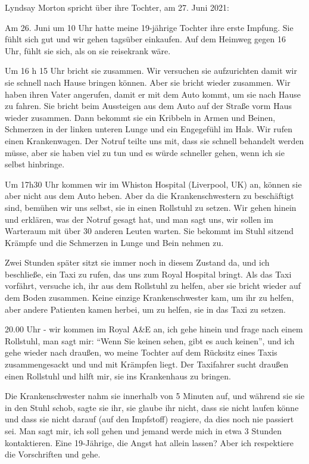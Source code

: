 Lyndsay Morton spricht über ihre Tochter, am 27. Juni 2021:

Am 26. Juni um 10 Uhr hatte meine 19-jährige Tochter ihre erste Impfung. Sie
fühlt sich gut und wir gehen tagsüber einkaufen. Auf dem Heimweg gegen 16 Uhr,
fühlt sie sich, als on sie reisekrank wäre.

Um 16 h 15 Uhr bricht sie zusammen. Wir versuchen sie aufzurichten damit wir sie
schnell nach Hause bringen können. Aber sie bricht wieder zusammen. Wir haben
ihren Vater angerufen, damit er mit dem Auto kommt, um sie nach Hause zu
fahren. Sie bricht beim Aussteigen aus dem Auto auf der Straße vorm Haus wieder
zusammen. Dann bekommt sie ein Kribbeln in Armen und Beinen, Schmerzen in der
linken unteren Lunge und ein Engegefühl im Hals. Wir rufen einen
Krankenwagen. Der Notruf teilte uns mit, dass sie schnell behandelt werden
müsse, aber sie haben viel zu tun und es würde schneller gehen, wenn ich sie
selbst hinbringe.

Um 17h30 Uhr kommen wir im Whiston Hospital (Liverpool, UK) an, können sie aber
nicht aus dem Auto heben. Aber da die Krankenschwestern zu beschäftigt sind,
bemühen wir uns selbst, sie in einen Rollstuhl zu setzen. Wir gehen hinein und
erklären, was der Notruf gesagt hat, und man sagt uns, wir sollen im Warteraum
mit über 30 anderen Leuten warten. Sie bekommt im Stuhl sitzend Krämpfe und die
Schmerzen in Lunge und Bein nehmen zu.

Zwei Stunden später sitzt sie immer noch in diesem Zustand da, und ich
beschließe, ein Taxi zu rufen, das uns zum Royal Hospital bringt. Als das Taxi
vorfährt, versuche ich, ihr aus dem Rollstuhl zu helfen, aber sie bricht wieder
auf dem Boden zusammen. Keine einzige Krankenschwester kam, um ihr zu helfen,
aber andere Patienten kamen herbei, um zu helfen, sie in das Taxi zu setzen.

20.00 Uhr - wir kommen im Royal A\&E an, ich gehe hinein und frage nach einem
Rollstuhl, man sagt mir: “Wenn Sie keinen sehen, gibt es auch keinen”, und ich
gehe wieder nach draußen, wo meine Tochter auf dem Rücksitz eines Taxis
zusammengesackt und und mit Krämpfen liegt. Der Taxifahrer sucht draußen einen
Rollstuhl und hilft mir, sie ins Krankenhaus zu bringen.

Die Krankenschwester nahm sie innerhalb von 5 Minuten auf, und während sie sie
in den Stuhl schob, sagte sie ihr, sie glaube ihr nicht, dass sie nicht laufen
könne und dass sie nicht darauf (auf den Impfstoff) reagiere, da dies noch nie
passiert sei. Man sagt mir, ich soll gehen und jemand werde mich in etwa 3
Stunden kontaktieren. Eine 19-Jährige, die Angst hat allein lassen? Aber ich
respektiere die Vorschriften und gehe.

